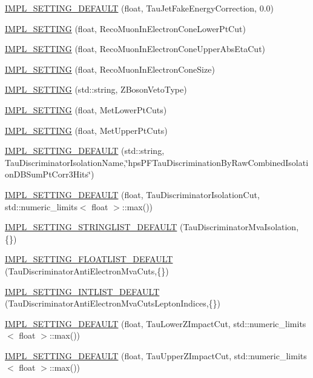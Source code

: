 \begin{DoxyCompactItemize}
\item 
\hyperlink{classHttSettings_a47895350290a623b6cf46c4766091eeb}{IMPL\_\-SETTING\_\-DEFAULT} (float, TauJetFakeEnergyCorrection, 0.0)
\item 
\hyperlink{classHttSettings_a4b994d80181858ca1b197d37322e1126}{IMPL\_\-SETTING} (float, RecoMuonInElectronConeLowerPtCut)
\item 
\hyperlink{classHttSettings_a40db97084ea0a152fe85fd95b5f54cb6}{IMPL\_\-SETTING} (float, RecoMuonInElectronConeUpperAbsEtaCut)
\item 
\hyperlink{classHttSettings_aa5139267789fb86b9c690d26df803901}{IMPL\_\-SETTING} (float, RecoMuonInElectronConeSize)
\item 
\hyperlink{classHttSettings_a0f3c47cc748cad7c207b7efa7a3ff978}{IMPL\_\-SETTING} (std::string, ZBosonVetoType)
\item 
\hyperlink{classHttSettings_a4bc5e270180cfed1780f508edc312d7e}{IMPL\_\-SETTING} (float, MetLowerPtCuts)
\item 
\hyperlink{classHttSettings_a2939619972a67313042065bb11281e49}{IMPL\_\-SETTING} (float, MetUpperPtCuts)
\item 
\hyperlink{classHttSettings_a2b5e602f6e39dc6a1f02edc944fd5419}{IMPL\_\-SETTING\_\-DEFAULT} (std::string, TauDiscriminatorIsolationName,\char`\"{}hpsPFTauDiscriminationByRawCombinedIsolationDBSumPtCorr3Hits\char`\"{})
\item 
\hyperlink{classHttSettings_a1578ae26bbc066aa5706fbbd1d8a495c}{IMPL\_\-SETTING\_\-DEFAULT} (float, TauDiscriminatorIsolationCut, std::numeric\_\-limits$<$ float $>$::max())
\item 
\hyperlink{classHttSettings_a369684e978992824030fcba3051c8792}{IMPL\_\-SETTING\_\-STRINGLIST\_\-DEFAULT} (TauDiscriminatorMvaIsolation,\{\})
\item 
\hyperlink{classHttSettings_aa62e419cb8c62e4690f4e49ee721984f}{IMPL\_\-SETTING\_\-FLOATLIST\_\-DEFAULT} (TauDiscriminatorAntiElectronMvaCuts,\{\})
\item 
\hyperlink{classHttSettings_ab2dc5540ed68cd907957fa57019a6a4e}{IMPL\_\-SETTING\_\-INTLIST\_\-DEFAULT} (TauDiscriminatorAntiElectronMvaCutsLeptonIndices,\{\})
\item 
\hyperlink{classHttSettings_a52928e3bba3d62d14e8138e2cab0f63e}{IMPL\_\-SETTING\_\-DEFAULT} (float, TauLowerZImpactCut, std::numeric\_\-limits$<$ float $>$::max())
\item 
\hyperlink{classHttSettings_a6a8a32ca297a735b05c67ef579ef594a}{IMPL\_\-SETTING\_\-DEFAULT} (float, TauUpperZImpactCut, std::numeric\_\-limits$<$ float $>$::max())

\end{DoxyCompactItemize}

